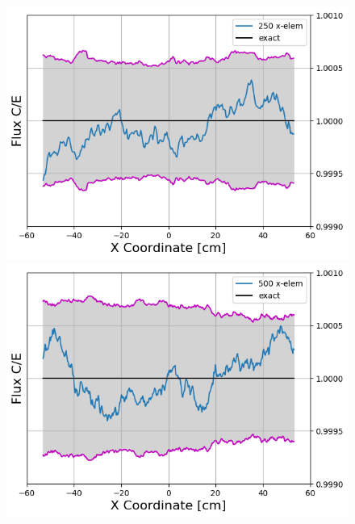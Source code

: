 \documentclass[letterpaper]{mc2023}
\begin{document}
\begin{figure}[H]
\begin{minipage}[b]{0.48\linewidth}
    \end{minipage}
    \begin{minipage}[b]{0.48\linewidth}
        \includegraphics[width=\linewidth]{figures/250_flux_CE_error_bars}
    \end{minipage}
    \begin{minipage}[b]{0.48\linewidth}
        \includegraphics[width=\linewidth]{figures/500_flux_CE_error_bars}
    \end{minipage}
    \begin{minipage}[b]{0.48\linewidth}

\end{minipage}
\end{figure}
\end{document}
